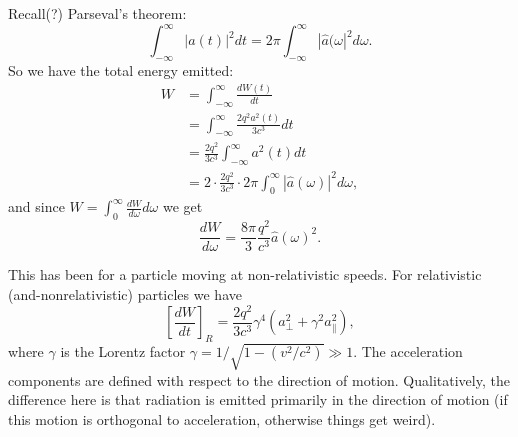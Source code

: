 \documentclass[../a122main.tex]{subfiles}
\begin{document}
Recall(?) Parseval's theorem:
\[ \int_{-\infty}^{\infty} |a(t)|^2 dt = 2\pi \int_{-\infty}^{\infty} |\hat a(\omega|^2 d\omega. \]
So we have the total energy emitted:
\begin{align*}
    W &= \int_{-\infty}^{\infty} \frac{dW(t)}{dt} \\
    &= \int_{-\infty}^{\infty} \frac{2q^2 a^2(t)}{3c^3} dt \\
    &= \frac{2q^2}{3c^3} \int_{-\infty}^{\infty} a^2(t) dt \\
    &= 2 \cdot \frac{2q^2}{3c^3} \cdot 2\pi \int_{0}^{\infty} |\hat a(\omega)|^2 d\omega,
\end{align*}
and since $W = \int_{0}^{\infty} \frac{dW}{d\omega} d\omega$ we get
\[ \frac{dW}{d\omega} = \frac{8\pi}{3} \frac{q^2}{c^3} \hat a(\omega)^2. \]

This has been for a particle moving at non-relativistic speeds.
For relativistic (and-nonrelativistic) particles we have
\[ \left[ \frac{dW}{dt} \right]_R = \frac{2q^2}{3c^3} \gamma^{4} (a_\perp^2 + \gamma^2 a_\parallel^2), \]
where $\gamma$ is the Lorentz factor $\gamma = 1 / \sqrt{1 - (v^2 / c^2)} \gg 1$.
The acceleration components are defined with respect to the direction of motion.
Qualitatively, the difference here is that radiation is emitted primarily in the direction of motion (if this motion is orthogonal to acceleration, otherwise things get weird).
\end{document}
